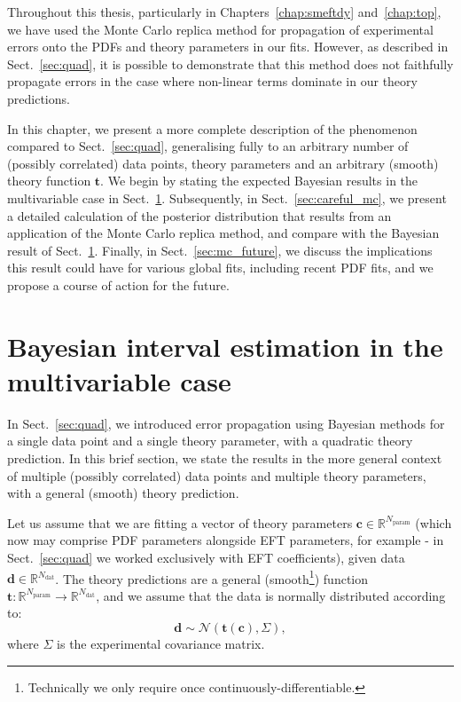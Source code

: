 \documentclass[withindex,glossary]{cam-thesis}
\renewcommand{\vec}[1]{\textbf{#1}} %
\begin{document}
\noindent Throughout this thesis, particularly in Chapters~\ref{chap:smeftdy} and~\ref{chap:top}, we have used the Monte Carlo replica method for propagation of experimental errors onto the PDFs and theory parameters in our fits. However, as described in Sect.~\ref{sec:quad}, it is possible to demonstrate that this method does not faithfully propagate errors in the case where non-linear terms dominate in our theory predictions.

In this chapter, we present a more complete description of the phenomenon compared to Sect.~\ref{sec:quad}, generalising fully to an arbitrary number of (possibly correlated) data points, theory parameters and an arbitrary (smooth) theory function $\vec{t}$. We begin by stating the expected Bayesian results in the multivariable case in Sect.~\ref{sec:interval_estimation}. Subsequently, in Sect.~\ref{sec:careful_mc}, we present a detailed calculation of the posterior distribution that results from an application of the Monte Carlo replica method, and compare with the Bayesian result of Sect.~\ref{sec:interval_estimation}. Finally, in Sect.~\ref{sec:mc_future}, we discuss the implications this result could have for various global fits, including recent PDF fits, and we propose a course of action for the future.


\section{Bayesian interval estimation in the multivariable case}
\label{sec:interval_estimation}

In Sect.~\ref{sec:quad}, we introduced error propagation using Bayesian methods for a single data point and a single theory parameter, with a quadratic theory prediction. In this brief section, we state the results in the more general context of multiple (possibly correlated) data points and multiple theory parameters, with a general (smooth) theory prediction.

Let us assume that we are fitting a vector of theory parameters $\vec{c} \in \mathbb{R}^{N_{\text{param}}}$ (which now may comprise PDF parameters alongside EFT parameters, for example - in Sect.~\ref{sec:quad} we worked exclusively with EFT coefficients), given data $\vec{d} \in \mathbb{R}^{N_{\text{dat}}}$. The theory predictions are a general (smooth\footnote{Technically we only require once continuously-differentiable.}) function $\vec{t} : \mathbb{R}^{N_{\text{param}}} \rightarrow \mathbb{R}^{N_{\text{dat}}}$, and we assume that the data is normally distributed according to:
\begin{equation}
\vec{d} \sim \mathcal{N}(\vec{t}(\vec{c}), \Sigma),
\end{equation}
where $\Sigma$ is the experimental covariance matrix.
\end{document}
